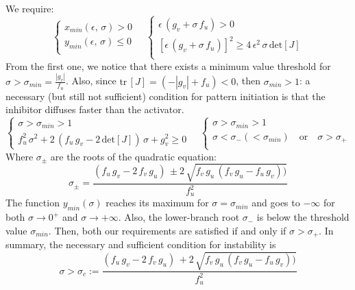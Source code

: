 \newline
We require:
\begin{equation*}
    \begin{cases}
        x_{min}(\epsilon,\,\sigma)>0 \\
        y_{min}(\epsilon,\,\sigma)\leq 0 \\
    \end{cases}
    \quad
        \begin{cases}
        \epsilon\,(g_v +\sigma\,f_u) > 0 \\
        [\epsilon\,(g_v +\sigma\,f_u)]^2 \geq 4\,\epsilon^2\,\sigma\,\text{det}[J] \\
    \end{cases}
\end{equation*} 
From the first one, we notice that there exists a minimum value threshold for $\sigma > \sigma_{min}= \frac{|g_v|}{f_u}$. Also, since $\text{tr}\,[J]=(-|g_v| +f_u)<0$, then $\sigma_{min}> 1$: a necessary (but still not sufficient) condition for pattern initiation is that the inhibitor diffuses faster than the activator.
\begin{equation*}
    \begin{cases}
        \sigma > \sigma_{min} >1  \\
        f_u^2\,\sigma^2 + 2\,(f_u\,g_v-2\,\text{det}[J])\,\sigma + g_v^2 \geq 0 
    \end{cases}
    \quad 
    \begin{cases}
    \sigma > \sigma_{min} >1  \\
    \sigma < \sigma_{-}(<\sigma_{min}) \quad \text{or} \quad  \sigma > \sigma_{+}\\
    \end{cases}
\end{equation*} 
Where $\sigma_{\pm}$ are the roots of the quadratic equation:
\begin{equation*}
    \sigma_{\pm} = \frac{(f_u\,g_v - 2\,f_v\,g_u)\,\pm 2\,\sqrt{f_v\,g_u\,(f_v\,g_u-f_u\,g_v))}}{f_u^2}
\end{equation*}
The function $y_{min}(\sigma)$ reaches its maximum for $\sigma=\sigma_{min}$ and goes to $-\infty$ for both $\sigma\rightarrow0^{+}$ and $\sigma\rightarrow +\infty$. Also, the lower-branch root $\sigma_{-}$ is below the threshold value $\sigma_{min}$. Then, both our requirements are satisfied if and only if $\sigma>\sigma_{+}$. In summary, the necessary and sufficient condition for instability is
\begin{equation*}
 \sigma > \sigma_c :=  \frac{(f_u\,g_v - 2\,f_v\,g_u)\, + 2\,\sqrt{f_v\,g_u\,(f_v\,g_u-f_u\,g_v))}}{f_u^2}
\end{equation*}

